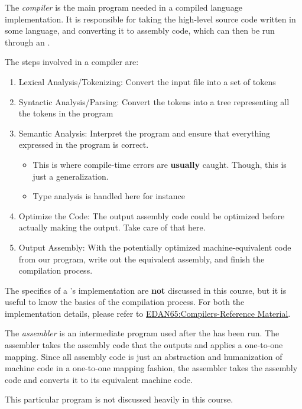 \begin{definition}[Compiler]\label{def:Compiler}
  The \emph{compiler} is the main program needed in a compiled language implementation.
  It is responsible for taking the high-level source code written in some language, and converting it to assembly code, which can then be run through an .

  The steps involved in a compiler are:
  \begin{enumerate}[noitemsep]
  \item Lexical Analysis/Tokenizing: Convert the input file into a set of tokens
  \item Syntactic Analysis/Parsing: Convert the tokens into a tree representing all the tokens in the program
  \item Semantic Analysis: Interpret the program and ensure that everything expressed in the program is correct.
    \begin{itemize}[noitemsep]
    \item This is where compile-time errors are \textbf{usually} caught. Though, this is just a generalization.
    \item Type analysis is handled here for instance
    \end{itemize}
    
  \item Optimize the Code: The output assembly code could be optimized before actually making the output. Take care of that here.
  \item Output Assembly: With the potentially optimized machine-equivalent code from our program, write out the equivalent assembly, and finish the compilation process.
  \end{enumerate}

  \begin{remark}
    The specifics of a 's implementation are \textbf{not} discussed in this course, but it is useful to know the basics of the compilation process.
    For both the implementation details, please refer to \href{run:./EDAN65-Compilers-Reference_Sheet.pdf}{EDAN65:Compilers-Reference Material}.
  \end{remark}
\end{definition}

\begin{definition}[Assembler]\label{def:Assembler}
  The \emph{assembler} is an intermediate program used after the  has been run.
  The assembler takes the assembly code that the  outputs and applies a one-to-one mapping.
  Since all assembly code is just an abstraction and humanization of machine code in a one-to-one mapping fashion, the assembler takes the assembly code and converts it to its equivalent machine code.

  \begin{remark}
    This particular program is not discussed heavily in this course.
  \end{remark}
\end{definition}

